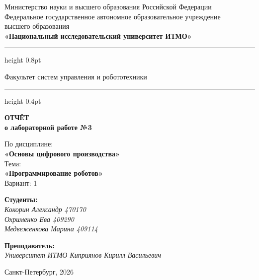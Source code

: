 \documentclass[a4paper,12pt]{article}
\begin{document}
	
	\begin{titlepage}
		\centering
		
		\vspace*{0.5cm}
		{\small
			Министерство науки и высшего образования Российской Федерации\\[2pt]
			Федеральное государственное автономное образовательное учреждение\\
			высшего образования\\[2pt]
			\textbf{«Национальный исследовательский университет ИТМО»}\\
		}
		
		\vspace{0.8cm}
		\hrule height 0.8pt
		\vspace{0.3cm}
		
		{\large Факультет систем управления и робототехники}
		
		\vspace{0.3cm}
		\hrule height 0.4pt
		\vspace{2.5cm}
		
		{\Huge\bfseries ОТЧЁТ}\\[0.4cm]
		{\LARGE\bfseries о лабораторной работе №3}\\[0.8cm]
		
		\begin{tcolorbox}[
			colback=gray!4,
			colframe=gray!10,
			boxrule=0.8pt,
			arc=4pt,
			left=12pt, right=12pt, top=8pt, bottom=8pt
			]
			\centering
			{\large По дисциплине:\\[4pt]}
			{\large\bfseries «Основы цифрового производства»}\\[10pt]
			{\large Тема:\\[4pt]}
			{\large\bfseries «Программирование роботов»} \\[10pt]
			{\large Вариант: 1}
		\end{tcolorbox}
		\vspace{3cm}
		
		
		\begin{minipage}{0.45\textwidth}
			\raggedright
			{\large\bfseries Студенты:}\\[4pt]
			\textit{Кокорин Александр 470170}\\
			\textit{Охрименко Ева 409290}\\
			\textit{Медвеженкова Марина 409114}
		\end{minipage}%
		\hfill
		\begin{minipage}{0.45\textwidth}
			\raggedleft
			{\large\bfseries Преподаватель:}\\[4pt]
			\textit{Университет ИТМО \hfill Киприянов Кирилл Васильевич
			}
		\end{minipage}
		
		\vfill
		\vspace{0.4cm}
		{\large Санкт-Петербург, 2026}
	\end{titlepage}
	
\end{document}
